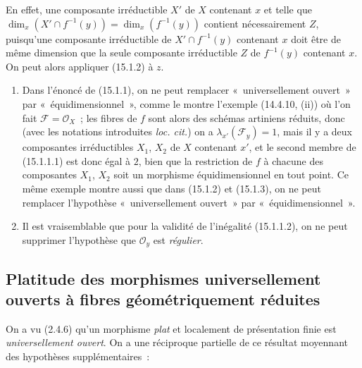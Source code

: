 En effet, une composante irréductible $X'$ de $X$ contenant $x$ et telle que
$\dim_x(X'\cap f^{-1}(y))=\dim_x(f^{-1}(y))$ contient nécessairement $Z$,
puisqu'une composante irréductible de $X'\cap f^{-1}(y)$ contenant $x$ doit être
de même dimension que la seule composante irréductible $Z$ de $f^{-1}(y)$
contenant $x$. On peut alors appliquer (15.1.2) à $z$.

\begin{remarks}[15.1.4]
\label{IV.15.1.4-fr}
\begin{enumerate}[label=(\roman*)]
  \item Dans l'énoncé de (15.1.1), on ne peut remplacer «~universellement
  ouvert~» par «~équidimensionnel~», comme le montre l'exemple (14.4.10, (ii)) où
  l'on fait $\mathcal F=\mathcal O_X$~; les fibres de $f$ sont alors des schémas
  artiniens réduits, donc (avec les notations introduites \emph{loc. cit.}) on a
  $\lambda_{x'}(\mathcal F_y)=1$, mais il y a deux composantes irréductibles
  $X_1$, $X_2$ de $X$ contenant $x'$, et le second membre de (15.1.1.1) est donc
  égal à $2$, bien que la restriction de $f$ à chacune des composantes $X_1$,
  $X_2$ soit un morphisme équidimensionnel en tout point. Ce même exemple montre
  aussi que dans (15.1.2) et (15.1.3), on ne peut remplacer l'hypothèse
  «~universellement ouvert~» par «~équidimensionnel~».
  \item Il est vraisemblable que pour la validité de l'inégalité (15.1.1.2), on
  ne peut supprimer l'hypothèse que $\mathcal O_y$ est \emph{régulier}.
\end{enumerate}
\end{remarks}

\subsection{Platitude des morphismes universellement ouverts à fibres géométriquement réduites}
\label{subsection:IV.15.2-fr}

\begin{env}[15.2.1]
\label{IV.15.2.1-fr}
On a vu (2.4.6) qu'un morphisme \emph{plat} et localement de présentation finie
est \emph{universellement ouvert}. On a une réciproque partielle de ce résultat
moyennant des hypothèses supplémentaires~:
\end{env}

